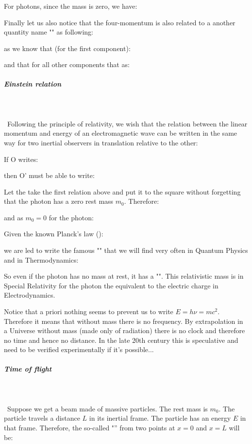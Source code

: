 	For photons, since the mass is zero, we have:
	
	Finally let us also notice that the four-momentum is also related to a another quantity name "" as following:
	
	as we know that (for the first component):
	
	and that for all other components that as:
	
	
	\subparagraph{Einstein relation}\mbox{}\\\\\
	Following the principle of relativity, we wish that the relation between the linear momentum and energy of an electromagnetic wave can be written in the same way for two inertial observers in translation relative to the other:

	If O writes:
	
	then O' must be able to write:
	
	Let the take the first relation above and put it to the square without forgetting that the photon has a zero rest mass $m_0$. Therefore:
	
	and as $m_0=0$ for the photon:
	
	Given the known Planck's law ():
	
	we are led to write the famous "\label{Einstein's relation}" that we will find very often in Quantum Physics and in Thermodynamics:
		
	So even if the photon has no mass at rest, it has a "". This relativistic mass is in Special Relativity for the photon the equivalent to the electric charge in Electrodynamics.
	
	\begin{tcolorbox}[title=Remark,colframe=black,arc=10pt]
	Notice that a priori nothing seems to prevent us to write $E=h\nu=mc^2$. Therefore it means that without mass there is no frequency. By extrapolation in a Universe without mass (made only of radiation) there is no clock and therefore no time and hence no distance. In the late 20th century this is speculative and need to be verified experimentally if it's possible...
	\end{tcolorbox}
	
	\subparagraph{Time of flight}\mbox{}\\\\\
	Suppose we get a beam made of massive particles. The rest mass  is $m_0$. The particle travels a distance $L$ in its inertial frame. The particle has an energy $E$ in that frame. Therefore, the so-called "” from two points at $x=0$ and $x=L$ will be:
	

